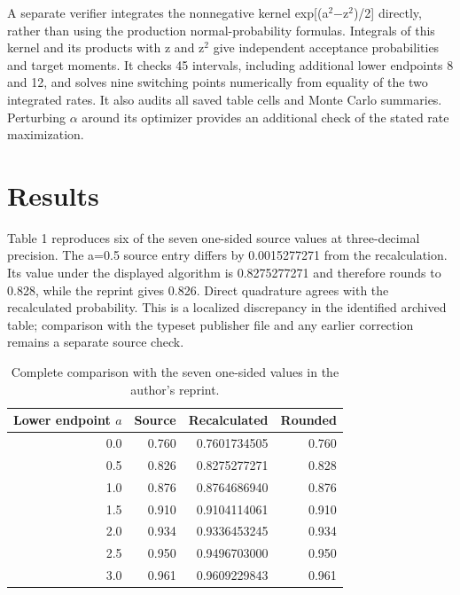 A separate verifier integrates the nonnegative kernel exp[(a$^2$$-$z$^2$)/2] directly, rather than using the production normal-probability formulas. Integrals of this kernel and its products with z and z$^2$ give independent acceptance probabilities and target moments. It checks 45 intervals, including additional lower endpoints 8 and 12, and solves nine switching points numerically from equality of the two integrated rates. It also audits all saved table cells and Monte Carlo summaries. Perturbing $\alpha$ around its optimizer provides an additional check of the stated rate maximization.

\section{Results}

Table 1 reproduces six of the seven one-sided source values at three-decimal precision. The a=0.5 source entry differs by 0.0015277271 from the recalculation. Its value under the displayed algorithm is 0.8275277271 and therefore rounds to 0.828, while the reprint gives 0.826. Direct quadrature agrees with the recalculated probability. This is a localized discrepancy in the identified archived table; comparison with the typeset publisher file and any earlier correction remains a separate source check.

\begin{table}[tbp]
\centering\small\setlength{\tabcolsep}{3pt}
\begin{tabular}{@{}rrrr@{}}
\toprule

Lower endpoint $a$ & Source & Recalculated & Rounded \\
\midrule

0.0 & 0.760 & 0.7601734505 & 0.760 \\

0.5 & 0.826 & 0.8275277271 & 0.828 \\

1.0 & 0.876 & 0.8764686940 & 0.876 \\

1.5 & 0.910 & 0.9104114061 & 0.910 \\

2.0 & 0.934 & 0.9336453245 & 0.934 \\

2.5 & 0.950 & 0.9496703000 & 0.950 \\

3.0 & 0.961 & 0.9609229843 & 0.961 \\

\bottomrule
\end{tabular}
\caption{Complete comparison with the seven one-sided values in the author's reprint.}
\end{table}

